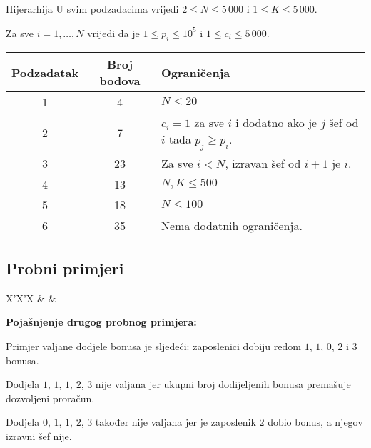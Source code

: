 \begin{statement}[
  problempoints=100,
  timelimit=1 sekunda,
  memorylimit=1024 MiB,
]{Hijerarhija}
U svim podzadacima vrijedi $2 \leq N \leq 5\,000$ i $1 \leq K \leq 5\,000$.

Za sve $i = 1, \dots, N$ vrijedi da je $1 \leq p_i \leq 10^5$ i $1 \leq c_i \leq 5\,000$.

{\renewcommand{\arraystretch}{1.4}
  \setlength{\tabcolsep}{6pt}
  \begin{tabular}{ccl}
   Podzadatak & Broj bodova & Ograničenja \\ \midrule
   	1 & 4 & $N \leq 20$ \\
    2 & 7 & $c_i = 1$ za sve $i$ i dodatno ako je $j$ šef od $i$ tada $p_j \geq p_i$. \\
    3 & 23 & Za sve $i < N$, izravan šef od $i + 1$ je $i$. \\
    4 & 13 & $N, K \leq 500$ \\
    5 & 18 & $N \leq 100$ \\
    6 & 35 & Nema dodatnih ograničenja. \\
\end{tabular}}

\subsection*{Probni primjeri}
\begin{tabularx}{\textwidth}{X'X'X}
 &
 &
\end{tabularx}

\textbf{Pojašnjenje drugog probnog primjera:}

Primjer valjane dodjele bonusa je sljedeći: zaposlenici dobiju redom $1$, $1$, $0$, $2$ i $3$ bonusa.

Dodjela $1$, $1$, $1$, $2$, $3$ nije valjana jer ukupni broj dodijeljenih bonusa premašuje dozvoljeni proračun.

Dodjela $0$, $1$, $1$, $2$, $3$ također nije valjana jer je zaposlenik $2$ dobio bonus, a njegov izravni šef nije.

\end{statement}

